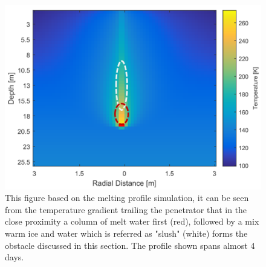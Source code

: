 \begin{figure}[H]
	\centering
	\includegraphics[width=.66\textwidth]{figures/comms/slushTrail}
	\caption{This figure based on the melting profile simulation, it can be seen from the temperature gradient trailing the penetrator that in the close proximity a column of melt water first (red), followed by a mix warm ice and water which is referred as "slush" (white) forms the obstacle discussed in this section. The profile shown spans almost 4 days.}
	\label{fig:through-ice_comms}
\end{figure}


